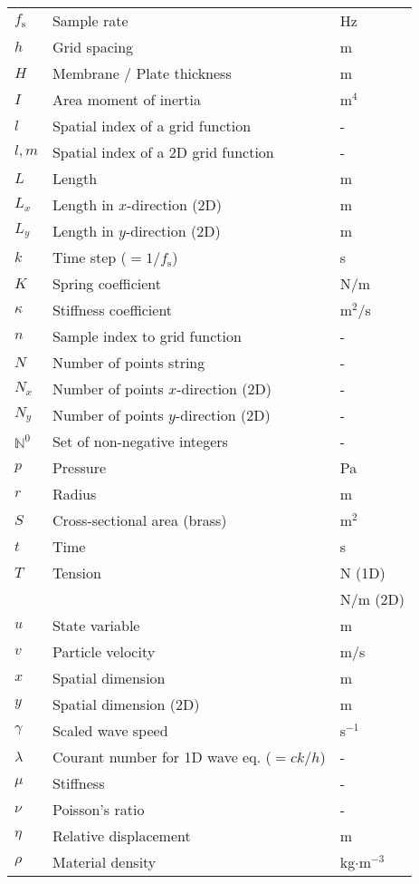 {\begin{longtable}{ p{2cm} p{6.5cm} p{2.5cm}  }
 $f_\text{s}$ & Sample rate & Hz\\
 $h$ & Grid spacing & m \\ 
 $H$ & Membrane / Plate thickness & m \\ 
 $I$ & Area moment of inertia & m$^4$\\
 $l$ & Spatial index of a grid function & - \\
 $l,m$ & Spatial index of a 2D grid function & - \\
 $L$ & Length & m\\
 $L_x$ & Length in $x$-direction (2D) & m\\
 $L_y$ & Length in $y$-direction (2D) & m\\
 $k$ & Time step ($=1/f_\text{s}$) & s\\
 $K$ & Spring coefficient & N/m\\
 $\kappa$ & Stiffness coefficient & m$^2$/s \\
 $n$ & Sample index to grid function & - \\
 $N$ & Number of points string & -\\
 $N_x$ & Number of points $x$-direction (2D) & -\\
 $N_y$ & Number of points $y$-direction (2D) & -\\
 $\mathbb{N}^0$ & Set of non-negative integers %
 & -\\
 $p$ & Pressure & Pa\\
 $r$ & Radius & m\\
 $S$ & Cross-sectional area (brass) & m$^2$\\
 $t$ & Time & s\\
 $T$ & Tension & N (1D)\\
 & & N/m (2D)\\
 $u$ & State variable & m\\ 
 $v$ & Particle velocity & m/s\\ 
 $x$ & Spatial dimension & m\\
 $y$ & Spatial dimension (2D) & m\\
 $\gamma$ & Scaled wave speed & s$^{-1}$\\
 $\lambda$ & Courant number for 1D wave eq. ($=ck/h$) & -\\
 $\mu$ & Stiffness  & -\\
 $\nu$ & Poisson's ratio & -\\
 $\eta$ & Relative displacement & m\\
 $\rho$ & Material density & kg$\cdot$m$^{-3}$\\

\end{longtable}}
